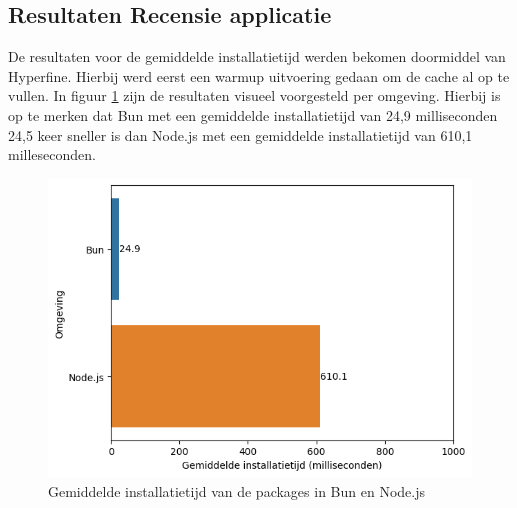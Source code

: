 \subsection{Resultaten Recensie applicatie}
De resultaten voor de gemiddelde installatietijd werden bekomen doormiddel van Hyperfine.
Hierbij werd eerst een warmup uitvoering gedaan om de cache al op te vullen.
In figuur \ref{fig:installatietijdapp} zijn de resultaten visueel voorgesteld per omgeving.
Hierbij is op te merken dat Bun met een gemiddelde installatietijd van 24,9 milliseconden 24,5 keer sneller 
is dan Node.js met een gemiddelde installatietijd van 610,1 milleseconden.
\begin{figure}[H]
  \centering
  \includegraphics{graphics/install.png}
  \caption{\label{fig:installatietijdapp}Gemiddelde installatietijd van de packages in Bun en Node.js}
\end{figure}

